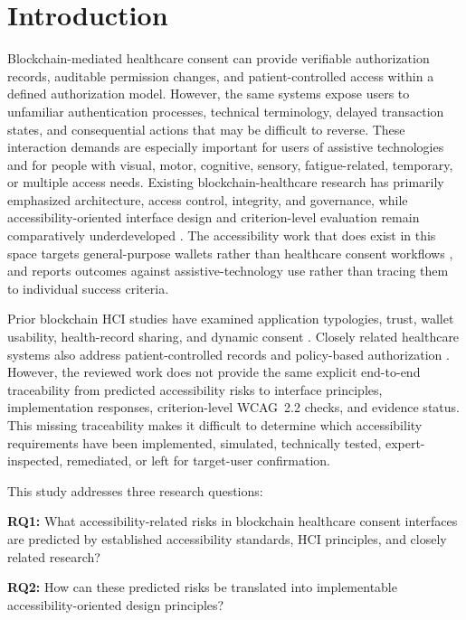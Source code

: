 \documentclass[journal]{IEEEtran}
\begin{document}
\section{Introduction}
Blockchain-mediated healthcare consent can provide verifiable authorization records, auditable permission changes, and patient-controlled access within a defined authorization model. However, the same systems expose users to unfamiliar authentication processes, technical terminology, delayed transaction states, and consequential actions that may be difficult to reverse. These interaction demands are especially important for users of assistive technologies and for people with visual, motor, cognitive, sensory, fatigue-related, temporary, or multiple access needs. Existing blockchain-healthcare research has primarily emphasized architecture, access control, integrity, and governance, while accessibility-oriented interface design and criterion-level evaluation remain comparatively underdeveloped \cite{tharani2022ui,khalid2023blockchain}. The accessibility work that does exist in this space targets general-purpose wallets rather than healthcare consent workflows \cite{zhou2023accessible}, and reports outcomes against assistive-technology use rather than tracing them to individual success criteria.

Prior blockchain HCI studies have examined application typologies, trust, wallet usability, health-record sharing, and dynamic consent \cite{elsden2018making,frohlich2022blockchain,zhou2023accessible,kim2022blockchain,khalid2023blockchain}. Closely related healthcare systems also address patient-controlled records and policy-based authorization \cite{dubovitskaya2020action,yaqub2025blockchain}. However, the reviewed work does not provide the same explicit end-to-end traceability from predicted accessibility risks to interface principles, implementation responses, criterion-level WCAG~2.2 checks, and evidence status. This missing traceability makes it difficult to determine which accessibility requirements have been implemented, simulated, technically tested, expert-inspected, remediated, or left for target-user confirmation.

This study addresses three research questions:

\noindent\textbf{RQ1:} What accessibility-related risks in blockchain healthcare consent interfaces are predicted by established accessibility standards, HCI principles, and closely related research?

\noindent\textbf{RQ2:} How can these predicted risks be translated into implementable accessibility-oriented design principles?
\end{document}
